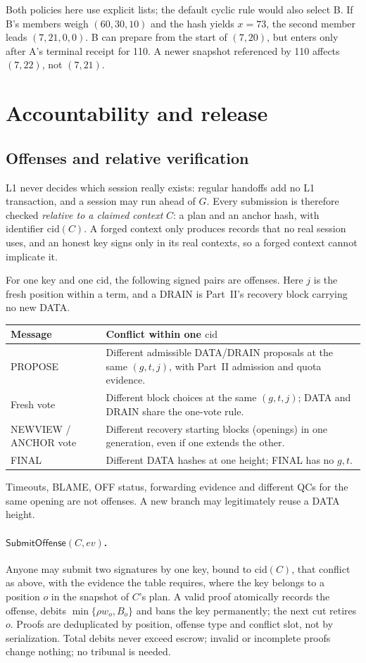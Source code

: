 \documentclass[11pt,a4paper]{article}
\newcommand{\tagg}[1]{\mathsf{#1}}
\newcommand{\cid}{\mathrm{cid}}
\begin{document}
Both policies here use explicit lists; the default cyclic rule would also
select B. If B's members weigh $(60,30,10)$ and the hash yields $x=73$, the
second member leads $(7,21,0,0)$. B can prepare from the start of
$(7,20)$, but enters only after A's terminal receipt for 110. A newer
snapshot referenced by 110 affects $(7,22)$, not $(7,21)$.

\section{Accountability and release}
\label{sec:account}
\subsection{Offenses and relative verification}
L1 never decides which session really exists: regular handoffs add no L1
transaction, and a session may run ahead of $G$. Every submission is
therefore checked \emph{relative to a claimed context} $C$: a plan and an
anchor hash, with identifier $\cid(C)$. A forged context only produces
records that no real session uses, and an honest key signs only in its
real contexts, so a forged context cannot implicate it.

For one key and one $\cid$, the following signed pairs are offenses. Here
$j$ is the fresh position within a term, and a DRAIN is Part~II's recovery
block carrying no new DATA.

\begin{tabularx}{\linewidth}{@{}>{\raggedright\arraybackslash}p{.24\linewidth}Y@{}}\toprule
Message & Conflict within one $\cid$\\\midrule
PROPOSE & Different admissible DATA/DRAIN proposals at the same $(g,t,j)$,
with Part~II admission and quota evidence.\\
Fresh vote & Different block choices at the same $(g,t,j)$; DATA and DRAIN
share the one-vote rule.\\
NEWVIEW / ANCHOR vote & Different recovery starting blocks (openings)
in one generation, even if one extends the other.\\
FINAL & Different DATA hashes at one height; FINAL has no $g,t$.\\\bottomrule
\end{tabularx}

Timeouts, BLAME, OFF status, forwarding evidence and different QCs for the
same opening are not offenses. A new branch may legitimately reuse a DATA
height.

\paragraph{$\tagg{SubmitOffense}(C,\mathit{ev})$.} Anyone may submit two
signatures by one key, bound to $\cid(C)$, that conflict as above, with the
evidence the table requires, where the key belongs to a position $o$ in
the snapshot of $C$'s plan. A valid proof atomically records the offense,
debits $\min\{\rho w_o,B_o\}$ and bans the key permanently; the next cut
retires $o$. Proofs are deduplicated by position, offense type and
conflict slot, not by serialization. Total debits never exceed escrow;
invalid or incomplete proofs change nothing; no tribunal is needed.
\end{document}
